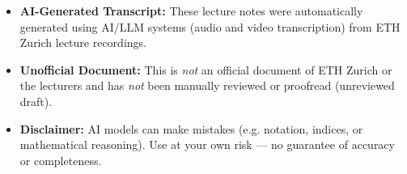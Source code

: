\documentclass[11pt,a4paper]{report}
\theoremstyle{purplethm}
\begin{document}
\begin{titlepage}
\begin{minipage}{\textwidth}
\begin{tcolorbox}[
        arc=6pt,
        boxrule=0.7pt,
        colback=MidnightBlue!3!white,
        colframe=MidnightBlue!30!white,
        left=10pt, right=10pt, top=8pt, bottom=8pt
    ]
    \vspace{0.25cm}
    \sffamily\small\color{black!75}
    \begin{itemize}[leftmargin=1.5em, itemsep=3pt, topsep=0pt, parsep=0pt]
        \item[\textcolor{MidnightBlue!80!black}{\small\faRobot}] \textbf{AI-Generated Transcript:} These lecture notes were automatically generated using AI/LLM systems (audio and video transcription) from ETH Zurich lecture recordings.
        \item[\textcolor{MidnightBlue!80!black}{\small\faUserShield}] \textbf{Unofficial Document:} This is \emph{not} an official document of ETH Zurich or the lecturers and has \emph{not} been manually reviewed or proofread (unreviewed draft).
        \item[\textcolor{MidnightBlue!80!black}{\small\faExclamationTriangle}] \textbf{Disclaimer:} AI models can make mistakes (e.g. notation, indices, or mathematical reasoning). Use at your own risk --- no guarantee of accuracy or completeness.
    \end{itemize}
    \end{tcolorbox}
\end{minipage}
\vspace*{0.5cm}
\end{titlepage}

\cleardoublepage
{}
\tableofcontents
\cleardoublepage



















\end{document}
